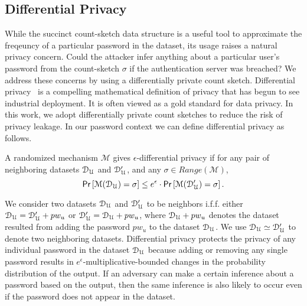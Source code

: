 \subsection{Differential Privacy} \label{section:Prelinmaries-DiffernetialPrivacy}
\vspace*{-\baselineskip}
While the succinct count-sketch data structure is a useful tool to approximate the freqeuncy of a particular password in the dataset, its usage raises a natural privacy concern. Could the attacker infer anything about a particular user's password from the count-sketch $\sigma$ if the authentication server was breached? We address these concerns by using a differentially private count sketch. Differential privacy~\cite{ECS:Dwork11} is a compelling mathematical definition of privacy that has begun to see industrial deployment\cite{CCS:ErlPihKor14}. It is often viewed as a gold standard for data privacy.  In this work, we adopt differentially private count sketches to reduce the risk of privacy leakage. {In our password context} we can define differential privacy as follows.
\vspace*{-\baselineskip}
\begin{definition} \label{def:diff}

	A randomized mechanism $\mathcal{M}$ gives $\epsilon$-differential privacy if for any pair of neighboring datasets $\mathcal{D}_{{\mathcal{U}}}$ and $\mathcal{D}_{{\mathcal{U}}}'$, and any $\sigma \in \mathit{Range}(\mathcal{M})$,
	$$\mathsf{Pr} \left[\mathcal{M}(\mathcal{D}_{{\mathcal{U}}})=\sigma\right]  \leq e^{\epsilon}\cdot \mathsf{Pr} \left[\mathcal{M}(\mathcal{D}_{{\mathcal{U}}}')=\sigma\right] .$$
\end{definition}
\vspace*{-\baselineskip}

We consider two datasets $\mathcal{D}_{{\mathcal{U}}}$ and $\mathcal{D}_{{\mathcal{U}}}'$ to be neighbors i.f.f. either $\mathcal{D}_{{\mathcal{U}}}=\mathcal{D}_{{\mathcal{U}}}' + pw_u$ or $\mathcal{D}_{{\mathcal{U}}}'=\mathcal{D}_{{\mathcal{U}}} + pw_u$, where $\mathcal{D}_{{\mathcal{U}}} +pw_u$ denotes the dataset resulted from adding the {password} $pw_u$ to the dataset $\mathcal{D}_{{\mathcal{U}}}$. We use $\mathcal{D}_{{\mathcal{U}}}\simeq \mathcal{D}_{{\mathcal{U}}}'$ to denote two neighboring datasets. {Differential privacy} protects the privacy of any {individual password in the dataset $\mathcal{D}_{{\mathcal{U}}}$} because adding or removing any single password results in $e^{\epsilon}$-multiplicative-bounded changes in the probability distribution of the output. If an adversary can make a certain inference about a password based on the output, then the same inference is also likely to occur even if the password does not appear in the dataset.

